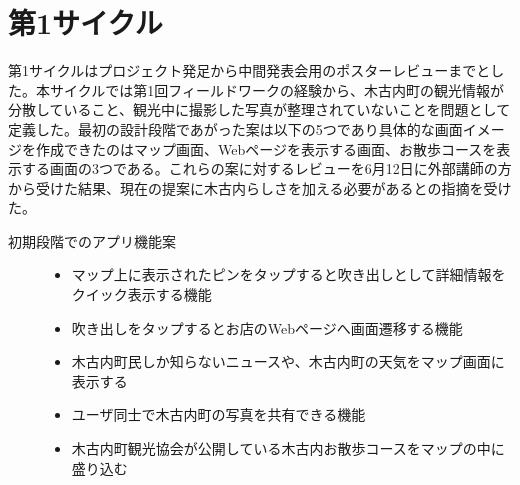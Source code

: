\section{第1サイクル}
第1サイクルはプロジェクト発足から中間発表会用のポスターレビューまでとした。本サイクルでは第1回フィールドワークの経験から、木古内町の観光情報が分散していること、観光中に撮影した写真が整理されていないことを問題として定義した。最初の設計段階であがった案は以下の5つであり具体的な画面イメージを作成できたのはマップ画面、Webページを表示する画面、お散歩コースを表示する画面の3つである。これらの案に対するレビューを6月12日に外部講師の方から受けた結果、現在の提案に木古内らしさを加える必要があるとの指摘を受けた。
\begin{description}
\item[初期段階でのアプリ機能案]\mbox{}
\begin{itemize}
 \item マップ上に表示されたピンをタップすると吹き出しとして詳細情報をクイック表示する機能
 \item 吹き出しをタップするとお店のWebページへ画面遷移する機能
 \item 木古内町民しか知らないニュースや、木古内町の天気をマップ画面に表示する
 \item ユーザ同士で木古内町の写真を共有できる機能
 \item 木古内町観光協会が公開している木古内お散歩コースをマップの中に盛り込む
\end{itemize}
\end{description}

